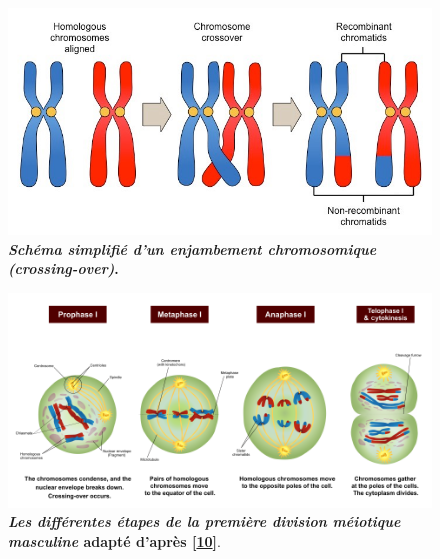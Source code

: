 \documentclass[12pt,a4paper,twoside]{ugathesis}
\theoremstyle{definition}
\theoremstyle{definition}
\theoremstyle{definition}
\theoremstyle{remark}
\begin{document}
\begin{figure}

{\centering \includegraphics[scale=0.35]{figure/crossingover} 

}

\caption[Schéma simplifié d'un enjambement chromosomique (crossing-over)]{\textbf{\emph{Schéma simplifié d'un enjambement
chromosomique (crossing-over)}.}}\label{fig:pictcrossingover}
\end{figure}




\newpage 

\begin{figure}

{\centering \includegraphics[scale=0.43]{figure/MeiosisI} 

}

\caption[Les différentes étapes de la première division méiotique masculine]{\textbf{\emph{Les différentes étapes de la première
division méiotique masculine} adapté d'après
{[}\protect\hyperlink{ref-Reece2014}{10}{]}}.}\label{fig:meiosei}
\end{figure}
\end{document}
